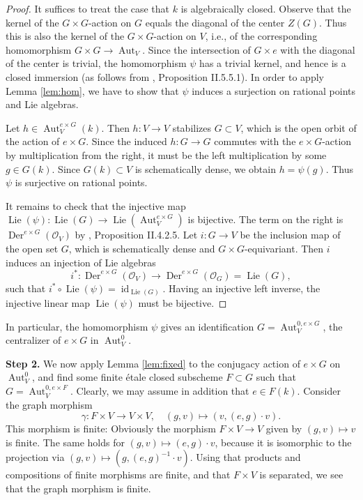 \documentclass[oneside, 12pt]{amsart}
\theoremstyle{definition}
\theoremstyle{remark}
\newcommand{\Aut}{\operatorname{Aut}}
\newcommand{\Der}{\operatorname{Der}}
\newcommand{\id}{{\operatorname{id}}}
\newcommand{\Lie}{\operatorname{Lie}}
\renewcommand{\O}{\mathscr{O}}
\newcommand{\ra}{\rightarrow}
\begin{document}
\begin{proof}
It suffices to treat the case that $k$ is algebraically closed.
Observe that the kernel of the  
$G \times G$-action on $G$ equals the diagonal of the center $Z(G)$. Thus 
this is also the kernel of the 
$G \times G$-action on $V$, i.e., of the
corresponding homomorphism  $G \times G \ra \Aut_V$. 
Since  the intersection of $G\times e$ with the diagonal of the center is trivial, the homomorphism
$\psi$ has a trivial kernel, and hence is a closed immersion 
(as follows from \cite{Demazure; Gabriel 1970}, Proposition II.5.5.1).
In order to apply Lemma \ref{lem:hom}, we have to show that $\psi$
induces a surjection on rational points and Lie algebras.

Let $h \in \Aut^{e \times G}_V(k)$. Then $h:V\ra V$  stabilizes $G\subset V$,
which is the open orbit of the action of $e \times G$.
Since  the induced  $h:G\ra G$
commutes with the $e\times G$-action by multiplication from the right, it must be 
the left multiplication by some $g \in G(k)$. Since $G(k)\subset V$
is schematically dense,
we obtain $h = \psi(g)$. Thus $\psi$ is surjective on rational points. 

It remains to check that the injective map 
$
\Lie(\psi) : \Lie(G) \ra \Lie(\Aut^{e \times G}_V) 
$ is bijective. The term on the right is  $\Der^{e \times G}(\O_V)$
by \cite{Demazure; Gabriel 1970}, Proposition II.4.2.5. 
Let $i:G\ra V$ be the inclusion map of the open set $G$, which is schematically dense
and $G\times G$-equivariant. Then $i$ induces an injection of Lie algebras
$$
i^* : \Der^{e \times G}(\O_V) 
\longrightarrow
\Der^{e \times G}(\O_G) = \Lie(G),
$$
such that $i^* \circ \Lie(\psi) = \id_{\Lie(G)}$.
Having an injective left inverse, the injective linear map 
$\Lie(\psi)$ must be bijective.
\end{proof}

In particular, the homomorphism $\psi$ gives an identification 
$G=\Aut_V^{0, e \times G}$,
the centralizer of $e \times G$ in $\Aut^0_V$.

\medskip\noindent
{\bf Step 2.}
We now apply Lemma \ref{lem:fixed} to the conjugacy action of $e \times G$
on $\Aut^0_V$, and find some finite \'etale closed subscheme $F\subset G$
such that $G=\Aut_V^{0,e\times F}$.
Clearly, we may assume in addition that $e \in F(k)$. 
Consider the graph morphism
\[ \gamma : F \times V \longrightarrow 
V \times V, \quad
(g,v) \longmapsto (v, (e,g) \cdot v). \]
This morphism is finite: Obviously the morphism 
$ F\times V\ra V$ given by $(g,v)\mapsto v$ is finite. 
The same holds for $(g,v)\mapsto (e,g)\cdot v$, because 
it is isomorphic to the projection
via $(g,v)\mapsto (g,(e,g)^{-1}\cdot v)$.
Using that products and compositions of finite morphisms are finite, 
and that $F\times V$ is separated,
we see that the graph morphism is finite.
\end{document}
